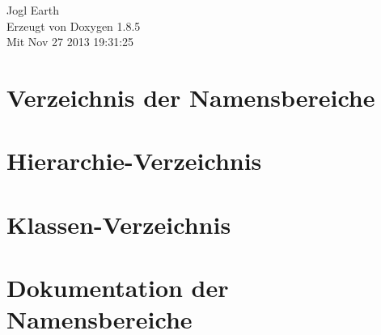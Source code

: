 \documentclass[twoside]{book}
\newcommand{\clearemptydoublepage}{%
  \newpage{\pagestyle{empty}\cleardoublepage}%
}
\begin{document}
\begin{titlepage}
\vspace*{7cm}
\begin{center}%
{\Large Jogl Earth }\\
\vspace*{1cm}
{\large Erzeugt von Doxygen 1.8.5}\\
\vspace*{0.5cm}
{\small Mit Nov 27 2013 19:31:25}\\
\end{center}
\end{titlepage}
\clearemptydoublepage
\tableofcontents
\clearemptydoublepage
{}

\chapter{Verzeichnis der Namensbereiche}

\chapter{Hierarchie-\/\-Verzeichnis}

\chapter{Klassen-\/\-Verzeichnis}

\chapter{Dokumentation der Namensbereiche}













\end{document}
